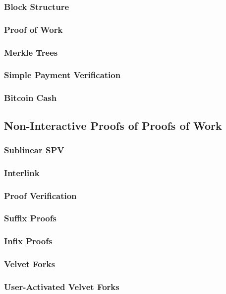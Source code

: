 \documentclass[11pt]{llncs}
\begin{document}
\subsubsection{Block Structure}
\subsubsection{Proof of Work}
\subsubsection{Merkle Trees}
\subsubsection{Simple Payment Verification}
\subsubsection{Bitcoin Cash}

\subsection{Non-Interactive Proofs of Proofs of Work}

\subsubsection{Sublinear SPV}
\subsubsection{Interlink}
\subsubsection{Proof Verification}
\subsubsection{Suffix Proofs}
\subsubsection{Infix Proofs}
\subsubsection{Velvet Forks}
\subsubsection{User-Activated Velvet Forks}
\end{document}
